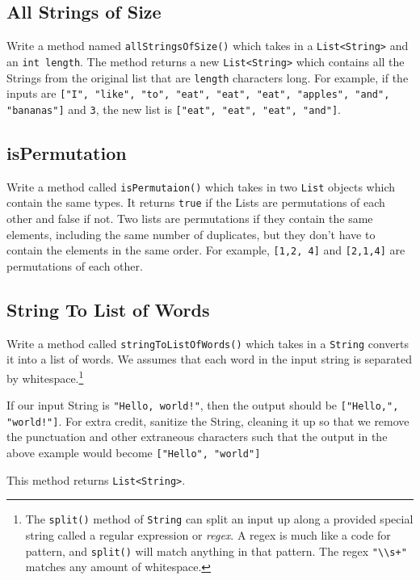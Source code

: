 \documentclass[10pt,letterpaper]{article}
\begin{document}
	
	\subsection{All Strings of Size}
	Write a method named \texttt{allStringsOfSize()} which takes in a \texttt{List<String>} and an \texttt{int length}.
	The method returns a new \texttt{List<String>} which contains all the Strings from the original list that are \texttt{length}  characters long.
	For example, if the inputs are \texttt{["I", "like", "to", "eat", "eat", "eat", "apples", "and", "bananas"]} and \texttt{3}, the new list is \texttt{["eat", "eat", "eat", "and"]}.
	
	
	\subsection{isPermutation}
	Write a method called \texttt{isPermutaion()} which takes in two \texttt{List} objects which contain the same types.
	It returns \texttt{true} if the Lists are permutations of each other and false if not.
	Two lists are permutations if they contain the same elements, including the same number of duplicates, but they don't have to contain the elements in the same order.
	For example, \texttt{[1,2, 4]} and \texttt{[2,1,4]} are permutations of each other. 	



	\subsection{String To List of Words}
	Write a method called \texttt{stringToListOfWords()} which takes in a \texttt{String} converts it into a list of words.
	We assumes that each word in the input string is separated by whitespace.\footnote{The \texttt{split()} method of \texttt{String} can split an input up along a provided special string called a regular expression or \textit{regex}.  A regex is much like a code for pattern, and \texttt{split()} will match anything in that pattern. The regex \texttt{"\textbackslash\textbackslash s+"} matches any amount of whitespace.}
	
	If our input String is \texttt{"Hello, world!"}, then the output should be \texttt{["Hello,", "world!"]}.
	For extra credit, sanitize the String, cleaning it up so that we remove the punctuation and other extraneous characters such that the output in the above example would become \texttt{["Hello", "world"]}
	
	This method returns \texttt{List<String>}.
	
\end{document}
